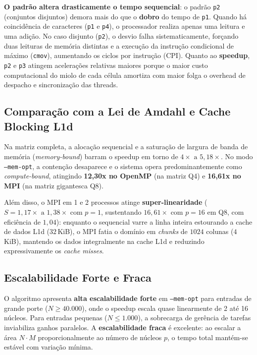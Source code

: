 \textbf{O padrão altera drasticamente o tempo sequencial}: o padrão \texttt{p2} (conjuntos disjuntos) demora mais do que o \textbf{dobro} do tempo de \texttt{p1}. Quando há coincidência de caracteres (\texttt{p1} e \texttt{p4}), o processador realiza apenas uma leitura e uma adição. No caso disjunto (\texttt{p2}), o desvio falha sistematicamente, forçando duas leituras de memória distintas e a execução da instrução condicional de máximo (\texttt{cmov}), aumentando os ciclos por instrução (CPI). Quanto ao \textbf{speedup}, \texttt{p2} e \texttt{p3} atingem acelerações relativas maiores porque o maior custo computacional do miolo de cada célula amortiza com maior folga o overhead de despacho e sincronização das threads.

\subsection{Comparação com a Lei de Amdahl e Cache Blocking L1d}

Na matriz completa, a alocação sequencial e a saturação de largura de banda de memória (\textit{memory-bound}) barram o speedup em torno de $4\times \text{ a } 5{,}18\times$. No modo \texttt{--mem-opt}, a contenção desaparece e o sistema opera predominantemente como \textit{compute-bound}, atingindo \textbf{12{,}30x no OpenMP} (na matriz Q4) e \textbf{16{,}61x no MPI} (na matriz gigantesca Q8). 

Além disso, o MPI em 1 e 2 processos atinge \textbf{super-linearidade} ($S = 1{,}17\times \text{ a } 1{,}38\times$ com $p=1$, sustentando $16{,}61\times$ com $p=16$ em Q8, com eficiência de $1{,}04$): enquanto o sequencial varre a linha inteira estourando a cache de dados L1d ($32$\,KiB), o MPI fatia o domínio em \textit{chunks} de $1024$ colunas ($4$\,KiB), mantendo os dados integralmente na cache L1d e reduzindo expressivamente os \textit{cache misses}.

\subsection{Escalabilidade Forte e Fraca}

O algoritmo apresenta \textbf{alta escalabilidade forte} em \texttt{--mem-opt} para entradas de grande porte ($N \ge 40.000$), onde o speedup escala quase linearmente de 2 até 16 núcleos. Para entradas pequenas ($N \le 1.000$), a sobrecarga de gerência de tarefas inviabiliza ganhos paralelos. A \textbf{escalabilidade fraca} é excelente: ao escalar a área $N \cdot M$ proporcionalmente ao número de núcleos $p$, o tempo total mantém-se estável com variação mínima.

